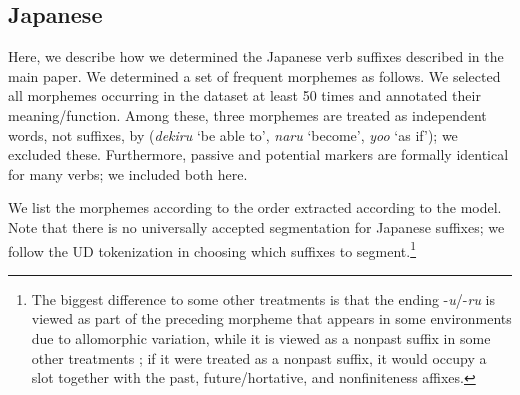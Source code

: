 \documentclass[11pt,letterpaper]{article}
\begin{document}
\subsection{Japanese}

Here, we describe how we determined the Japanese verb suffixes described in the main paper.
We determined a set of frequent morphemes as follows.
We selected all morphemes occurring in the dataset at least 50 times and annotated their meaning/function.
Among these, three morphemes are treated as independent words, not suffixes, by \cite{kaiser2013japanese} (\textit{dekiru} `be able to', \textit{naru} `become', \textit{yoo} `as if'); we excluded these.
Furthermore, passive and potential markers are formally identical for many verbs; we included both here.

We list the morphemes according to the order extracted according to the model.
Note that there  is no universally accepted segmentation for Japanese suffixes; we follow the UD tokenization in choosing which suffixes to segment.\footnote{The biggest difference to some other treatments is that the ending -\textit{u}/-\textit{ru} is viewed as part of the preceding morpheme that appears in some environments due to allomorphic variation, while it is viewed as a nonpast suffix in some other treatments \citep[p.116]{hasegawa2014japanese}; if it were treated as a nonpast suffix, it would occupy a slot together with the past, future/hortative, and nonfiniteness affixes.}
\end{document}
